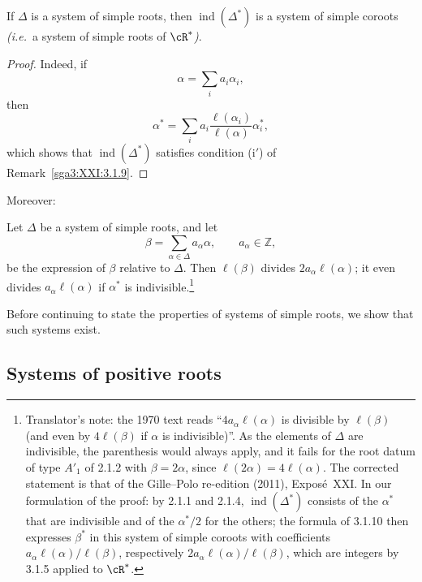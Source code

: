 \begin{corollary}\label{sga3:XXI:3.1.10}
If \(\Delta\) is a system of simple roots, then
\(\operatorname{ind}(\Delta^\ast)\) is a system of simple coroots
\emph{(i.e.}\ a system of simple roots of \(\cR^\ast\)\emph{)}.
\end{corollary}

\begin{proof}
Indeed, if
\[
 \alpha=\sum_i a_i\alpha_i,
\]
then
\[
 \alpha^\ast=\sum_i a_i\frac{\ell(\alpha_i)}{\ell(\alpha)}\alpha_i^\ast,
\]
which shows that \(\operatorname{ind}(\Delta^\ast)\) satisfies
condition (i\('\)) of Remark~\ref{sga3:XXI:3.1.9}.
\end{proof}

Moreover:

\begin{corollary}\label{sga3:XXI:3.1.11}
Let \(\Delta\) be a system of simple roots, and let
\[
 \beta=\sum_{\alpha\in\Delta}a_\alpha\alpha,
 \qquad a_\alpha\in\mathbb Z,
\]
be the expression of \(\beta\) relative to \(\Delta\). Then
\(\ell(\beta)\) divides \(2a_\alpha\ell(\alpha)\); it even divides
\(a_\alpha\ell(\alpha)\) if \(\alpha^\ast\) is indivisible.\footnote{Translator's
note: the 1970 text reads ``\(4a_\alpha\ell(\alpha)\) is divisible by \(\ell(\beta)\)
(and even by \(4\ell(\beta)\) if \(\alpha\) is indivisible)''. As the elements of
\(\Delta\) are indivisible, the parenthesis would always apply, and it fails for the
root datum of type \(A'_1\) of 2.1.2 with \(\beta=2\alpha\), since
\(\ell(2\alpha)=4\ell(\alpha)\). The corrected statement is that of the Gille--Polo
re-edition (2011), Exposé~XXI. In our formulation of the proof: by 2.1.1 and 2.1.4,
\(\operatorname{ind}(\Delta^\ast)\) consists of the \(\alpha^\ast\) that are
indivisible and of the \(\alpha^\ast/2\) for the others; the formula of 3.1.10 then
expresses \(\beta^\ast\) in this system of simple coroots with coefficients
\(a_\alpha\ell(\alpha)/\ell(\beta)\), respectively \(2a_\alpha\ell(\alpha)/\ell(\beta)\),
which are integers by 3.1.5 applied to \(\cR^\ast\).}
\end{corollary}

Before continuing to state the properties of systems of simple roots,
we show that such systems exist.

\subsection{Systems of positive roots}

